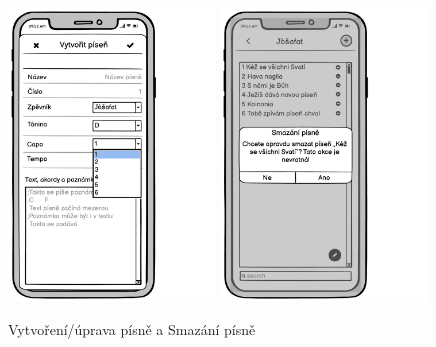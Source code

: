 \begin{figure}
    \includegraphics[width=0.49\textwidth]{images/B-navrh-ui/B-5-nova-pisen.pdf}
    \includegraphics[width=0.49\textwidth]{images/B-navrh-ui/B-5-smazat-pisen.pdf}
    \caption{Vytvoření/úprava písně a Smazání písně}
\end{figure}


